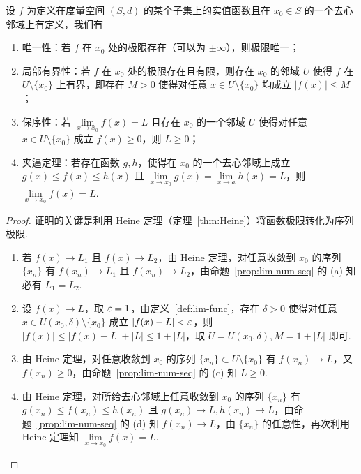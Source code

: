 \documentclass[../main.tex]{subfiles}
\begin{document}
\begin{proposition}[函数极限的基本性质] \label{prop:lim-func}
    设 $f$ 为定义在度量空间 $(S, d)$ 的某个子集上的实值函数且在 $x_0 \in S$ 的一个去心邻域上有定义，我们有
    \begin{enumerate}[label=(\alph*)]
        \item 唯一性：若 $f$ 在 $x_0$ 处的极限存在（可以为 $\pm\infty$），则极限唯一；
        \item 局部有界性：若 $f$ 在 $x_0$ 处的极限存在且有限，则存在 $x_0$ 的邻域 $U$ 使得 $f$ 在 $U \setminus \{x_0\}$ 上有界，即存在 $M > 0$ 使得对任意 $x \in U \setminus \{x_0\}$ 均成立 $|f(x)| \leqslant M$；
        \item 保序性：若 $\lim\limits_{x \to x_0} f(x) = L$ 且存在 $x_0$ 的一个邻域 $U$ 使得对任意 $x \in U \setminus \{x_0\}$ 成立 $f(x) \geqslant 0$，则 $L \geqslant 0$；
        \item 夹逼定理：若存在函数 $g, h$，使得在 $x_0$ 的一个去心邻域上成立 $g(x) \leqslant f(x) \leqslant h(x)$ 且 $\lim\limits_{x \to x_0} g(x) = \lim\limits_{x \to a} h(x) = L$，则 $\lim\limits_{x \to x_0} f(x) = L$. 
    \end{enumerate}
\end{proposition}

\begin{proof}
    证明的关键是利用 Heine 定理（定理~\ref{thm:Heine}）将函数极限转化为序列极限. 

    \begin{enumerate}[label=(\alph*)]
        \item 若 $f(x) \to L_1$ 且 $f(x) \to L_2$，由 Heine 定理，对任意收敛到 $x_0$ 的序列 $\{x_n\}$ 有 $f(x_n) \to L_1$ 且 $f(x_n) \to L_2$，由命题~\ref{prop:lim-num-seq} 的 (a) 知必有 $L_1 = L_2$. 

        \item 设 $f(x) \to L$，取 $\varepsilon = 1$，由定义~\ref{def:lim-func}，存在 $\delta > 0$ 使得对任意 $x \in U(x_0, \delta) \setminus \{x_0\}$ 成立 $|f(x) - L| < \varepsilon$，则 $|f(x)| \leqslant |f(x) - L| + |L| \leqslant 1 + |L|$，取 $U = U(x_0, \delta), M = 1 + |L|$ 即可. 

        \item 由 Heine 定理，对任意收敛到 $x_0$ 的序列 $\{x_n\} \subset U \setminus \{x_0\}$ 有 $f(x_n) \to L$，又 $f(x_n) \geqslant 0$，由命题~\ref{prop:lim-num-seq} 的 (c) 知 $L \geqslant 0$. 

        \item 由 Heine 定理，对所给去心邻域上任意收敛到 $x_0$ 的序列 $\{x_n\}$ 有 $g(x_n) \leqslant f(x_n) \leqslant h(x_n)$ 且 $g(x_n) \to L, h(x_n) \to L$，由命题~\ref{prop:lim-num-seq} 的 (d) 知 $f(x_n) \to L$，由 $\{x_n\}$ 的任意性，再次利用 Heine 定理知 $\lim\limits_{x \to x_0} f(x) = L$. \qedhere
    \end{enumerate}
\end{proof}
\end{document}
